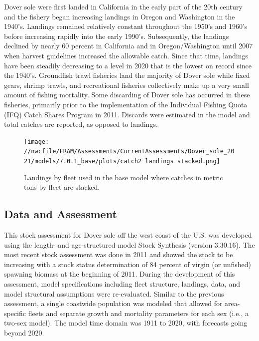 \documentclass[11pt,
  english,
  a4paper,
]{article}
\begin{document}
Dover sole were first landed in California in the early part of the 20th century and the fishery began increasing landings in Oregon and Washington in the 1940's. Landings remained relatively constant throughout the 1950's and 1960's before increasing rapidly into the early 1990's. Subsequently, the landings declined by nearly 60 percent in California and in Oregon/Washington until 2007 when harvest guidelines increased the allowable catch. Since that time, landings have been steadily decreasing to a level in 2020 that is the lowest on record since the 1940's. Groundfish trawl fisheries land the majority of Dover sole while fixed gears, shrimp trawls, and recreational fisheries collectively make up a very small amount of fishing mortality. Some discarding of Dover sole has occurred in these fisheries, primarily prior to the implementation of the Individual Fishing Quota (IFQ) Catch Shares Program in 2011. Discards were estimated in the model and total catches are reported, as opposed to landings.

\leavevmode\tagmcend\tagstructend\par




\begin{figure}
\centering
\texttt{[image: //nwcfile/FRAM/Assessments/CurrentAssessments/Dover\_sole\_2021/models/7.0.1\_base/plots/catch2 landings stacked.png]}
\caption{Landings by fleet used in the base model where catches in metric tons by fleet are stacked.\label{fig:es-catch}}
\end{figure}

\tagmcend\tagstructend


\hypertarget{data-and-assessment}{%
\subsection*{Data and Assessment}\label{data-and-assessment}}

\leavevmode\tagmcend\tagstructend


This stock assessment for Dover sole off the west coast of the U.S. was developed using the length- and age-structured model Stock Synthesis (version 3.30.16). The most recent stock assessment was done in 2011 and showed the stock to be increasing with a stock status determination of 84 percent of virgin (or unfished) spawning biomass at the beginning of 2011. During the development of this assessment, model specifications including fleet structure, landings, data, and model structural assumptions were re-evaluated. Similar to the previous assessment, a single coastwide population was modeled that allowed for area-specific fleets and separate growth and mortality parameters for each sex (i.e., a two-sex model). The model time domain was 1911 to 2020, with forecasts going beyond 2020.
\end{document}
